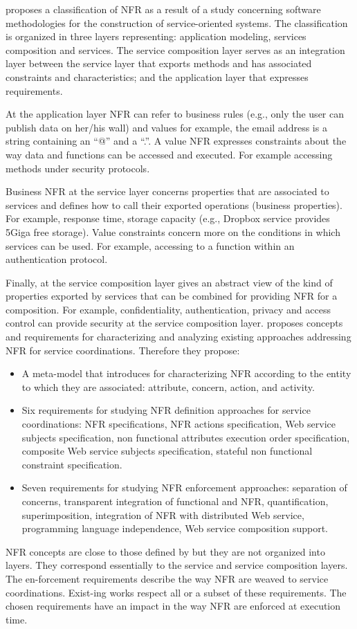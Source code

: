 \cite{Souza} proposes a classification of NFR as a result of a study concerning software methodologies for the construction of service-oriented systems. The classification  is organized in three layers representing: application modeling, services composition and services. The service composition layer serves as an integration layer between the service layer that exports methods and has associated constraints and characteristics; and the application layer that expresses requirements. 

At the application layer NFR can refer to business rules (e.g., only the user can publish data on her/his wall) and values for example, the email address is a string containing an “@” and a “.”. A value NFR expresses constraints about the way data and functions can be accessed and executed. For example accessing methods under security protocols.

Business NFR at the service layer concerns properties that are associated to services and defines how to call their exported operations (business properties). For example, response time, storage capacity (e.g., Dropbox service provides 5Giga free storage). Value constraints concern more on the conditions in which services can be used. For example, accessing to a function within an authentication protocol.

Finally, at the service composition layer gives an abstract view of the kind of properties exported by services that can be combined for providing NFR for a composition.  For example, confidentiality, authentication, privacy and access control can provide security at the service composition layer. 
\cite{ScCM10} proposes concepts and requirements for characterizing and analyzing existing approaches addressing NFR for service coordinations. Therefore they propose:
\begin{itemize}
\item	A meta-model that introduces for characterizing NFR according to the entity to which they are associated: attribute, concern, action, and activity. 
\item	Six requirements for studying NFR definition approaches for service coordinations: NFR specifications, NFR actions specification, Web service subjects specification, non functional attributes execution order specification, composite Web service subjects specification, stateful non functional constraint specification.

\item	Seven requirements for studying NFR enforcement approaches: separation of concerns, transparent integration of functional and NFR, quantification, superimposition, integration of NFR with distributed Web service, programming language independence, Web service composition support.
\end{itemize}

NFR concepts are close to those defined by \cite{Souza} but they are not organized into layers.  They correspond essentially to the service and service composition layers. The en-forcement requirements describe the way NFR are weaved to service coordinations. Exist-ing works respect all or a subset of these requirements. The chosen requirements have an impact in the way NFR are enforced at execution time.

